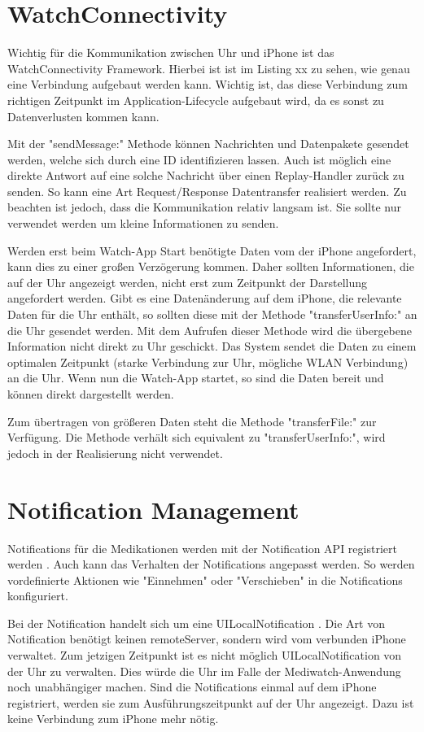\section{WatchConnectivity}
Wichtig für die Kommunikation zwischen Uhr und iPhone ist das WatchConnectivity Framework. Hierbei ist ist im Listing xx zu sehen, wie genau eine Verbindung aufgebaut werden kann. Wichtig ist, das diese Verbindung zum richtigen Zeitpunkt im Application-Lifecycle aufgebaut wird, da es sonst zu Datenverlusten kommen kann. 

Mit der "sendMessage:" Methode können Nachrichten und Datenpakete gesendet werden, welche sich durch eine ID identifizieren lassen. Auch ist möglich eine direkte Antwort auf eine solche Nachricht über einen Replay-Handler zurück zu senden. So kann eine Art Request/Response Datentransfer realisiert werden. Zu beachten ist jedoch, dass die Kommunikation relativ langsam ist. Sie sollte nur verwendet werden um kleine Informationen zu senden.

Werden erst beim Watch-App Start benötigte Daten vom der iPhone angefordert, kann dies zu einer großen Verzögerung kommen. Daher sollten Informationen, die auf der Uhr angezeigt werden, nicht erst zum Zeitpunkt der Darstellung angefordert werden. Gibt es eine Datenänderung auf dem iPhone, die relevante Daten für die Uhr enthält, so sollten diese mit der Methode "transferUserInfo:" an die Uhr gesendet werden. Mit dem Aufrufen dieser Methode wird die übergebene Information nicht direkt zu Uhr geschickt. Das System sendet die Daten zu einem optimalen Zeitpunkt (starke Verbindung zur Uhr, mögliche WLAN Verbindung) an die Uhr. Wenn nun die Watch-App startet, so sind die Daten bereit und können direkt dargestellt werden.

Zum übertragen von größeren Daten steht die Methode "transferFile:" zur Verfügung. Die Methode verhält sich equivalent zu "transferUserInfo:", wird jedoch in der Realisierung nicht verwendet.

\section{Notification Management}
Notifications für die Medikationen werden mit der Notification API  registriert werden \cite{Apple:2015notif}. Auch kann das Verhalten der Notifications angepasst werden. So werden vordefinierte Aktionen wie "Einnehmen" oder "Verschieben" in die Notifications konfiguriert.

Bei der Notification handelt sich um eine UILocalNotification \cite{Apple:2015notif}. Die Art von Notification benötigt keinen \gls{remoteServer}, sondern wird vom verbunden iPhone verwaltet. Zum jetzigen Zeitpunkt ist es nicht möglich UILocalNotification von der Uhr zu verwalten. Dies würde die Uhr im Falle der Mediwatch-Anwendung noch unabhängiger machen. Sind die Notifications einmal auf dem iPhone registriert, werden sie zum Ausführungszeitpunkt auf der Uhr angezeigt. Dazu ist keine Verbindung zum iPhone mehr nötig.


